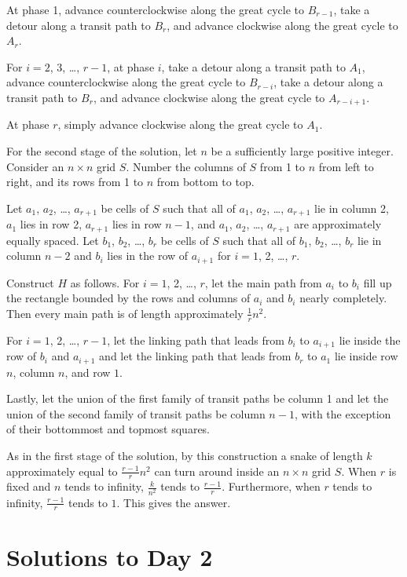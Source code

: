 \documentclass[11pt]{scrartcl}
\begin{document}
At phase 1, advance counterclockwise along the great cycle to $B_{r - 1}$, take a detour along a transit path to $B_r$, and advance clockwise along the great cycle to $A_r$.

For $i = 2$, 3, \dots, $r - 1$, at phase $i$, take a detour along a transit path to $A_1$, advance counterclockwise along the great cycle to $B_{r - i}$, take a detour along a transit path to $B_r$, and advance clockwise along the great cycle to $A_{r - i + 1}$.

At phase $r$, simply advance clockwise along the great cycle to $A_1$.

For the second stage of the solution, let $n$ be a sufficiently large positive integer. Consider an $n \times n$ grid $S$. Number the columns of $S$ from 1 to $n$ from left to right, and its rows from 1 to $n$ from bottom to top.

Let $a_1$, $a_2$, \dots, $a_{r + 1}$ be cells of $S$ such that all of $a_1$, $a_2$, \dots, $a_{r + 1}$ lie in column 2, $a_1$ lies in row 2, $a_{r + 1}$ lies in row $n - 1$, and $a_1$, $a_2$, \dots, $a_{r + 1}$ are approximately equally spaced. Let $b_1$, $b_2$, \dots, $b_r$ be cells of $S$ such that all of $b_1$, $b_2$, \dots, $b_r$ lie in column $n - 2$ and $b_i$ lies in the row of $a_{i + 1}$ for $i = 1$, 2, \dots, $r$.

Construct $H$ as follows. For $i = 1$, 2, \dots, $r$, let the main path from $a_i$ to $b_i$ fill up the rectangle bounded by the rows and columns of $a_i$ and $b_i$ nearly completely. Then every main path is of length approximately $\frac{1}{r}n^2$.

For $i = 1$, 2, \dots, $r - 1$, let the linking path that leads from $b_i$ to $a_{i + 1}$ lie inside the row of $b_i$ and $a_{i + 1}$ and let the linking path that leads from $b_r$ to $a_1$ lie inside row $n$, column $n$, and row $1$.

Lastly, let the union of the first family of transit paths be column 1 and let the union of the second family of transit paths be column $n - 1$, with the exception of their bottommost and topmost squares.

As in the first stage of the solution, by this construction a snake of length $k$ approximately equal to $\frac{r - 1}{r}n^2$ can turn around inside an $n \times n$ grid $S$. When $r$ is fixed and $n$ tends to infinity, $\frac{k}{n^2}$ tends to $\frac{r - 1}{r}$. Furthermore, when $r$ tends to infinity, $\frac{r - 1}{r}$ tends to $1$. This gives the answer.
\pagebreak

\section{Solutions to Day 2}
\end{document}
